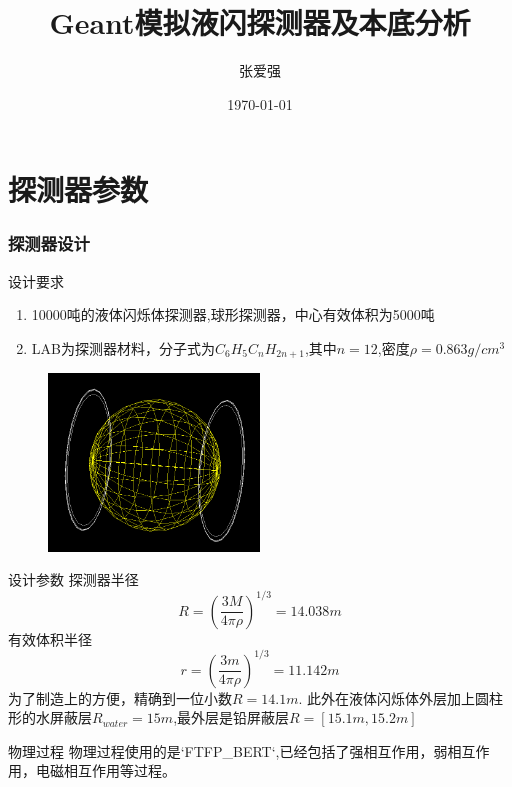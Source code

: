 \documentclass{beamer}
\title{Geant模拟液闪探测器及本底分析}
\author{张爱强}
\date{\today}
\begin{document}
\begin{frame}
    \titlepage
\end{frame}
\begin{frame}
    \tableofcontents
\end{frame}
\section{探测器参数}
\begin{frame}
    \frametitle{探测器设计}
    \begin{block}{设计要求}
        \begin{enumerate}
            \item 10000吨的液体闪烁体探测器,球形探测器，中心有效体积为5000吨
            \item LAB为探测器材料，分子式为$C_6H_5C_nH_{2n+1}$,其中$n=12$,密度$\rho=0.863g/cm^3$
        \end{enumerate}
    \end{block}
    \begin{figure}
        \includegraphics[width=0.5\textwidth]{figure/geometry.png}
    \end{figure}
\end{frame}
\begin{frame}
    \begin{block}{设计参数}
        探测器半径
        \[R=(\frac{3M}{4\pi\rho})^{1/3}=14.038m\]
        有效体积半径
        \[r=(\frac{3m}{4\pi\rho})^{1/3}=11.142m\]
        为了制造上的方便，精确到一位小数$R=14.1m$. 此外在液体闪烁体外层加上圆柱形的水屏蔽层$R_{water}=15m$,最外层是铅屏蔽层$R=[15.1m,15.2m]$
    \end{block}
    \begin{block}{物理过程}
        物理过程使用的是`FTFP_BERT`,已经包括了强相互作用，弱相互作用，电磁相互作用等过程。
    \end{block}
\end{frame}
\end{document}
